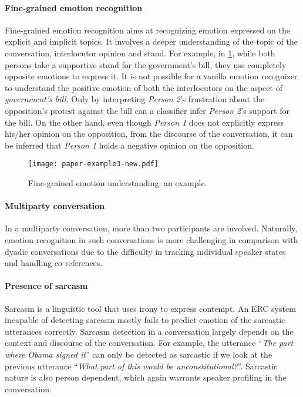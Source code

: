 \documentclass{IEEEtran}\usepackage[pdftex]{graphicx}
\begin{document}
	\paragraph{Fine-grained emotion recognition}
	Fine-grained emotion recognition aims at recognizing emotion expressed on the explicit and implicit topics. It involves a deeper understanding of the topic of the conversation, interlocutor opinion and stand. For example, in 
	\cref{fig:exampleshift}, while both persons take a supportive stand for the government's bill, they use completely opposite emotions to express it. It is not possible for a vanilla emotion recognizer to understand the positive emotion of both the interlocutors on the aspect of \emph{government's bill}. Only by interpreting {\it Person 2}'s frustration about the opposition's protest against the bill can a classifier infer {\it Person 2}'s support for the bill. On the other hand, even though {\it Person 1} does not explicitly express his/her opinion on the opposition, from the discourse of the conversation, it can be inferred that {\it Person 1} holds a negative opinion on the opposition.
	
	\begin{figure}[h] 
		\centering 
		\small
		\texttt{[image: paper-example3-new.pdf]} 
		\caption{Fine-grained emotion understanding: an example.}
		\label{fig:exampleshift}
	\end{figure}
	
	\paragraph{Multiparty conversation}
	In a multiparty conversation, more than two participants are involved. Naturally, emotion recognition in such conversations is more challenging in comparison with dyadic conversations due to the difficulty in tracking individual speaker states and handling co-references.
	
	\paragraph{Presence of sarcasm}


Sarcasm is a linguistic tool that uses irony to express contempt. An ERC system incapable of detecting sarcasm mostly fails to predict emotion of the sarcastic utterances correctly. Sarcasm detection in a conversation largely depends on the context and discourse of the conversation. For example, the utterance ``\textit{The part where Obama signed it}'' can only be detected as sarcastic if we look at the previous utterance ``\textit{What part of this would be unconstitutional?}''. Sarcastic nature is also person dependent, which again warrants speaker profiling in the conversation.
	
\end{document}
